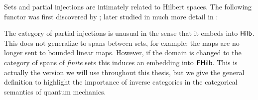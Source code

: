 Sets and partial injections are intimately related to Hilbert spaces.  The following functor was first discovered by \cite{barr}; later studied in much more detail in \cite{elltwo}:
The category of partial injections is unusual in the sense that it embeds into $\mathsf{Hilb}$. This does not generalize to spans between sets, for example: the maps are no longer sent to bounded linear maps.
However, if the domain is changed to the category of spans of {\em finite} sets this induces an embedding into $\mathsf{FHilb}$.  This is actually the version we will use throughout this thesis, but we give the general definition to highlight the importance of inverse categories in the categorical semantics of quantum mechanics.


